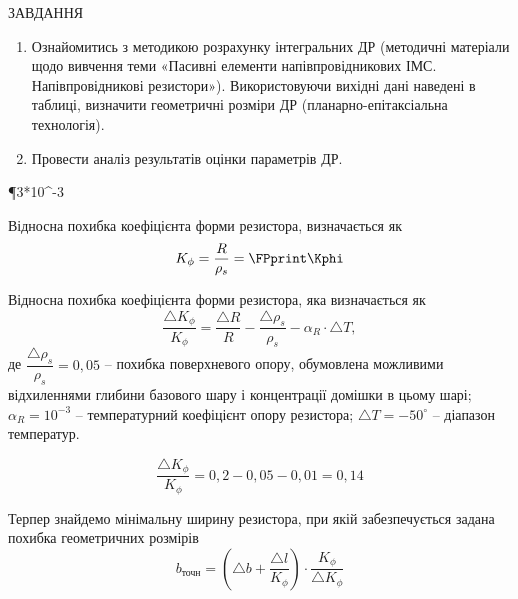 \documentclass[a4paper,14pt]{extreport}
\begin{document}
\begin{center}ЗАВДАННЯ\end{center}

\begin{enumerate}
  \item Ознайомитись з методикою розрахунку інтегральних ДР (методичні
  матеріали щодо вивчення теми «Пасивні елементи напівпровідникових
  ІМС. Напівпровідникові резистори»). Використовуючи вихідні дані
  наведені в таблиці, визначити геометричні розміри ДР (планарно-епітаксіальна технологія).
  \item Провести аналіз результатів оцінки параметрів ДР.
\end{enumerate}


\FPeval{}
\FPeval{} %
\FPeval{}
\FPeval\P {3*10^{-3}}
\FPeval{}
\FPeval{}
\FPeval{} 

\FPeval{}
\FPeval{}
\FPeval{}
\FPeval{}
\FPeval{}
\FPeval{}


\begin{center}
\end{center}

Відносна похибка коефіцієнта форми резистора, визначається як\\
 \FPeval{}
\begin{equation}
  K_{\phi} = \dfrac{R}{\rho_s} =   \FPprint\Kphi 
\end{equation}

Відносна похибка коефіцієнта форми резистора, яка визначається як
\begin{equation}
  \dfrac{\triangle K_{\phi}}{K_{\phi}} = \dfrac{\triangle R}{R} -
  \dfrac{\triangle \rho_s}{\rho_s} - \alpha_R \cdot \triangle T,
\end{equation}
де $\dfrac{\triangle \rho_s}{\rho_s} = 0,05$ -- похибка поверхневого опору, обумовлена можливими відхиленнями глибини базового шару і концентрації домішки в цьому шарі;\\
$\alpha_R = 10^{-3}$ -- температурний коефіцієнт опору резистора;
$\triangle T = -50^{\circ}$ -- діапазон температур. 


$$\dfrac{\triangle K_{\phi}}{K_{\phi}} = 0,2 - 0,05-0,01 = 0,14$$


Терпер знайдемо мінімальну ширину резистора, при якій 
забезпечується задана похибка геометричних розмірів\\
\begin{equation}
  b_{\text{точн}} = \left( \triangle b + \dfrac{\triangle l}{K_{\phi}}\right) \cdot \dfrac{K_{\phi}}{\triangle K_{\phi}}
\end{equation}
\end{document}
